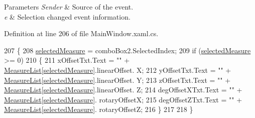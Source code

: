 \begin{DoxyParams}{Parameters}
{\em Sender} & Source of the event. \\
\hline
{\em e} & Selection changed event information. \\
\hline
\end{DoxyParams}


Definition at line 206 of file Main\+Window.\+xaml.\+cs.


\begin{DoxyCode}
207         \{
208             \hyperlink{class_l_i_d_a_r___controller_1_1_main_window_a01f677b33ad15d2f0cdf8df1c64cd0e2}{selectedMeasure} = comboBox2.SelectedIndex;
209             \textcolor{keywordflow}{if} (\hyperlink{class_l_i_d_a_r___controller_1_1_main_window_a01f677b33ad15d2f0cdf8df1c64cd0e2}{selectedMeasure} >= 0)
210             \{
211                 xOffsetTxt.Text = \textcolor{stringliteral}{""} + \hyperlink{class_l_i_d_a_r___controller_1_1_main_window_add7555b1a79fa1c17cd18dcf98859b9c}{MeasureList}[\hyperlink{class_l_i_d_a_r___controller_1_1_main_window_a01f677b33ad15d2f0cdf8df1c64cd0e2}{selectedMeasure}].linearOffset.
      X;
212                 yOffsetTxt.Text = \textcolor{stringliteral}{""} + \hyperlink{class_l_i_d_a_r___controller_1_1_main_window_add7555b1a79fa1c17cd18dcf98859b9c}{MeasureList}[\hyperlink{class_l_i_d_a_r___controller_1_1_main_window_a01f677b33ad15d2f0cdf8df1c64cd0e2}{selectedMeasure}].linearOffset.
      Y;
213                 zOffsetTxt.Text = \textcolor{stringliteral}{""} + \hyperlink{class_l_i_d_a_r___controller_1_1_main_window_add7555b1a79fa1c17cd18dcf98859b9c}{MeasureList}[\hyperlink{class_l_i_d_a_r___controller_1_1_main_window_a01f677b33ad15d2f0cdf8df1c64cd0e2}{selectedMeasure}].linearOffset.
      Z;
214                 degOffsetXTxt.Text = \textcolor{stringliteral}{""} + \hyperlink{class_l_i_d_a_r___controller_1_1_main_window_add7555b1a79fa1c17cd18dcf98859b9c}{MeasureList}[\hyperlink{class_l_i_d_a_r___controller_1_1_main_window_a01f677b33ad15d2f0cdf8df1c64cd0e2}{selectedMeasure}].
      rotaryOffsetX;
215                 degOffsetZTxt.Text = \textcolor{stringliteral}{""} + \hyperlink{class_l_i_d_a_r___controller_1_1_main_window_add7555b1a79fa1c17cd18dcf98859b9c}{MeasureList}[\hyperlink{class_l_i_d_a_r___controller_1_1_main_window_a01f677b33ad15d2f0cdf8df1c64cd0e2}{selectedMeasure}].
      rotaryOffsetZ;
216             \}
217 
218         \}
\end{DoxyCode}
